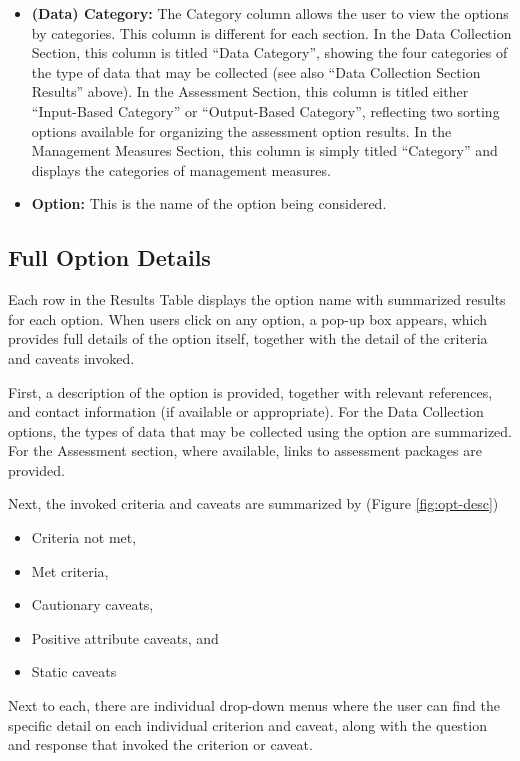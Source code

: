 \documentclass[11pt,]{book}
\providecommand{\tightlist}{%
  \setlength{\itemsep}{0pt}\setlength{\parskip}{0pt}}
\begin{document}
\begin{itemize}
\item
  \textbf{(Data) Category:} The Category column allows the user to view the options by categories. This column is different for each section. In the Data Collection Section, this column is titled ``Data Category'', showing the four categories of the type of data that may be collected (see also ``Data Collection Section Results'' above). In the Assessment Section, this column is titled either ``Input-Based Category'' or ``Output-Based Category'', reflecting two sorting options available for organizing the assessment option results. In the Management Measures Section, this column is simply titled ``Category'' and displays the categories of management measures.
\item
  \textbf{Option:} This is the name of the option being considered.
\end{itemize}

\hypertarget{full-option-details}{%
\subsection{Full Option Details}\label{full-option-details}}

Each row in the Results Table displays the option name with summarized results for each option. When users click on any option, a pop-up box appears, which provides full details of the option itself, together with the detail of the criteria and caveats invoked.

First, a description of the option is provided, together with relevant references, and contact information (if available or appropriate). For the Data Collection options, the types of data that may be collected using the option are summarized. For the Assessment section, where available, links to assessment packages are provided.

Next, the invoked criteria and caveats are summarized by (Figure \ref{fig:opt-desc})

\begin{itemize}
\tightlist
\item
  Criteria not met,
\item
  Met criteria,
\item
  Cautionary caveats,
\item
  Positive attribute caveats, and
\item
  Static caveats
\end{itemize}

Next to each, there are individual drop-down menus where the user can find the specific detail on each individual criterion and caveat, along with the question and response that invoked the criterion or caveat.
\end{document}
